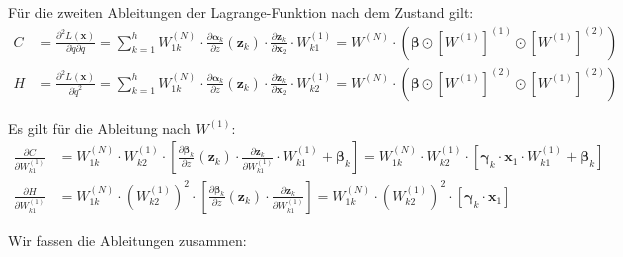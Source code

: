\documentclass[a4paper, 12pt]{scrartcl}
\begin{document}
Für die zweiten Ableitungen der Lagrange-Funktion nach dem Zustand gilt:
\begin{align*}
    C
    &=
    \frac{\partial^2 L(\bm{x})}{\partial \dot{q} \partial q}
    =
    \sum_{k=1}^{h}
    W^{(N)}_{1k} 
    \cdot
    \frac{\partial \bm{\alpha}_k}{\partial z}(\bm{z}_k)
    \cdot 
    \frac{\partial \bm{z}_k}{\partial \bm{x}_2}
    \cdot
    W^{(1)}_{k1}
    = 
    W^{(N)} 
    \cdot 
    \left(
        \bm{\beta}
        \odot
        \left[W^{(1)}\right]^{(1)}
        \odot 
        \left[W^{(1)}\right]^{(2)}
    \right)
    \\
    H
    &=
    \frac{\partial^2 L(\bm{x})}{\partial \dot{q}^2}
    =
    \sum_{k=1}^{h} W_{1k}^{(N)} 
    \cdot 
    \frac{\partial \bm{\alpha}_k}{\partial z}(\bm{z}_k)
    \cdot 
    \frac{\partial \bm{z}_k}{\partial \bm{x}_2}
    \cdot
    W^{(1)}_{k2}
    = 
    W^{(N)} \cdot 
    \left(
        \bm{\beta}
        \odot
        \left[W^{(1)}\right]^{(2)}
        \odot 
        \left[W^{(1)}\right]^{(2)}
    \right)
\end{align*}

Es gilt für die Ableitung nach $W^{(1)}$:
\begin{align*}
    \frac{\partial C}{\partial W^{(1)}_{k1}}
    &=
    W^{(N)}_{1k} 
    \cdot
    W^{(1)}_{k2}
    \cdot 
    \left[
        \frac{\partial \bm{\beta}_k}{\partial z}(\bm{z}_k)
        \cdot 
        \frac{\partial \bm{z}_k}{\partial W^{(1)}_{k1}}
        \cdot 
        W^{(1)}_{k1}
        +
        \bm{\beta}_k 
    \right]
    =
    W^{(N)}_{1k} 
    \cdot
    W^{(1)}_{k2}
    \cdot 
    \left[
        \bm{\gamma}_k
        \cdot 
        \bm{x}_1
        \cdot 
        W^{(1)}_{k1}
        +
        \bm{\beta}_k 
    \right]
    \\
    \frac{\partial H}{\partial W^{(1)}_{k1}}
    &=
    W^{(N)}_{1k} 
    \cdot
    \left(W^{(1)}_{k2}\right)^2
    \cdot 
    \left[
        \frac{\partial \bm{\beta}_k}{\partial z}(\bm{z}_k)
        \cdot 
        \frac{\partial \bm{z}_k}{\partial W^{(1)}_{k1}}
    \right]
    =
    W^{(N)}_{1k} 
    \cdot
    \left(W^{(1)}_{k2}\right)^2
    \cdot 
    \left[
        \bm{\gamma}_k
        \cdot 
        \bm{x}_1
    \right]
\end{align*}

Wir fassen die Ableitungen zusammen:
\end{document}
